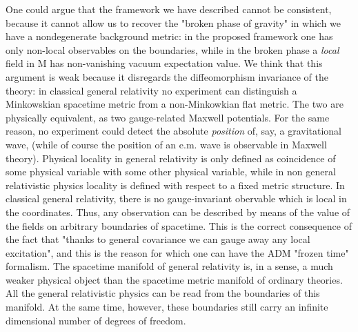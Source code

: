One could argue that the framework we have described cannot be
consistent, because it cannot allow us to recover the "broken phase
of gravity" in which we have a nondegenerate background metric: in
the proposed framework one has only non-local observables on the
boundaries, while in the broken phase a \emph{local} field in M has
non-vanishing vacuum expectation value. We think that this argument is
weak because it disregards the diffeomorphism invariance of the theory:
in classical general relativity no experiment can distinguish a
Minkowskian spacetime metric from a non-Minkowkian flat metric.  The two
are physically equivalent, as two gauge-related Maxwell potentials.  For
the same reason, no experiment could detect the absolute \emph{position} of,
say, a gravitational wave, (while of course the position of an e.m. wave
is observable in Maxwell theory).
Physical locality in general relativity is only defined as coincidence
of some physical variable with some other physical variable, while in
non general relativistic physics locality is defined with respect to a
fixed metric structure.  In classical general relativity, there is no
gauge-invariant obervable which is local in the coordinates. Thus,
any observation can be described by means of the value of the fields
on arbitrary boundaries of spacetime. This is the correct consequence
of the fact that "thanks to general covariance we can gauge away any
local excitation", and this is the reason for which one can have the ADM
"frozen time" formalism.  The spacetime manifold of general relativity
is, in a sense, a much weaker physical object than the spacetime metric
manifold of ordinary theories.  All the general relativistic physics can
be read from the boundaries of this manifold. At the same time, however,
these boundaries still carry an infinite dimensional number of degrees
of freedom. 


